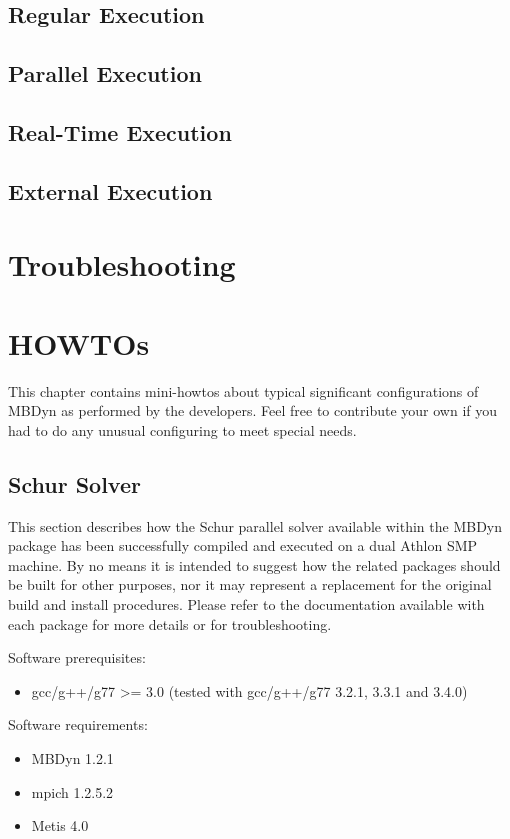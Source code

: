 \documentclass[10pt,dvips]{report}
\begin{document}
\section{Regular Execution}

\section{Parallel Execution}

\section{Real-Time Execution}

\section{External Execution}

\chapter{Troubleshooting}

\chapter{HOWTOs}
This chapter contains mini-howtos about typical significant 
configurations of MBDyn as performed by the developers.
Feel free to contribute your own if you had to do any unusual
configuring to meet special needs.

\section{Schur Solver}
This section describes how the Schur parallel solver available
within the MBDyn package has been successfully compiled and executed
on a dual Athlon SMP machine.
By no means it is intended to suggest how the related packages 
should be built for other purposes, nor it may represent a replacement
for the original build and install procedures.
Please refer to the documentation available with each package
for more details or for troubleshooting.

\noindent
Software prerequisites:
\begin{itemize}
\item gcc/g++/g77 >= 3.0 (tested with gcc/g++/g77 3.2.1, 3.3.1 and 3.4.0)
\end{itemize}
Software requirements:
\begin{itemize}
\item MBDyn 1.2.1
\item mpich 1.2.5.2
\item Metis 4.0
\end{itemize}
\end{document}
